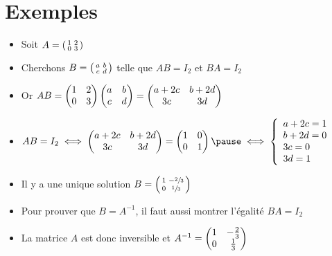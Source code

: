 \section{Exemples}

\begin{frame}
\begin{exemple} 
\begin{itemize}
  \item Soit $A=\left(\begin{smallmatrix}
1 & 2 \cr
0 & 3 \cr
\end{smallmatrix}\right)$

  \item\pause
Cherchons $B= \left(\begin{smallmatrix}
a & b \cr
c & d\cr
\end{smallmatrix}\right)$ telle que $AB=I_2$ et $BA=I_2$
  
  \item\pause Or $AB=\begin{pmatrix}
1 & 2 \cr
0 & 3\cr
\end{pmatrix}
\begin{pmatrix}
a & b \cr
c & d\cr
\end{pmatrix}
=\begin{pmatrix}
a+2c & b+2d \cr
3c & 3d\cr
\end{pmatrix}$
  
  \item\pause 
\vspace{-.2cm}
{\small
$
AB=I_2 \iff
\begin{pmatrix}
a+2c & b+2d \cr
3c & 3d\cr
\end{pmatrix}
=\begin{pmatrix}
1 & 0 \cr
0 & 1\cr
\end{pmatrix}
\pause
 \iff 
\left\{ \begin{array}{l}
a+2c=1\\        
b+2d=0\\
3c=0\\
3d=1\\
\end{array} \right.
$}
  
  \item\pause Il y a une unique solution $B=\left(\begin{smallmatrix}
1 & - \sfrac{2}{3} \cr
0 & \sfrac{1}{3}\cr
\end{smallmatrix}\right)$
  
  \item\pause Pour prouver que $B=A^{-1}$, il faut aussi montrer l'égalité $BA=I_2$
  
  \item\pause La matrice $A$ est donc inversible et $A^{-1}= \begin{pmatrix}
1 & -\frac23 \cr
0 & \frac13\cr
\end{pmatrix}$
\end{itemize}


\end{exemple}
\end{frame}

